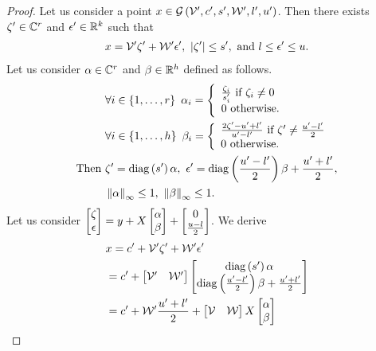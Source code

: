 \begin{proof}
Let us consider a point
$x\in\mathcal{G}\left(\mathcal{V}^\prime,c^\prime,s^\prime,\mathcal{W}^\prime,l^\prime,u^\prime\right)$.
Then there exists $\zeta^\prime\in\mathbb{C}^r$ and
$\epsilon^\prime\in\mathbb{R}^k$ such that
%
\begin{align*}
x=\ptemp^\pr\zeta^\pr+\stemp^\pr\epsilon^\pr,~\absolute{\zeta^\pr}\leq\sfact^\pr,~\text{and}~\lb\leq\epsilon^\pr\leq\ub.%
\end{align*}
%
Let us consider $\alpha\in\mathbb{C}^r$ and $\beta\in\mathbb{R}^h$ defined as follows.
%
\begin{align*}
&  \forall i\in\set{1,\ldots,r}~\alpha_i=\lt\{\begin{array}{l}
  \frac{\zeta_i}{\sfact^\pr_i}~\text{if}~\zeta_i\neq 0\\
  0~\text{otherwise}.
  \end{array}
  \rt.\\
  & \forall i\in\set{1,\ldots,h}~\beta_i=\lt\{
  \begin{array}{l}
  \frac{2\zeta^\pr-\ub^\pr+\lb^\pr}{\ub^\pr-\lb^\pr}~\text{if}~\zeta^\pr\neq\frac{\ub^\pr-\lb^\pr}{2}\\
  0~\text{otherwise}.
    \end{array}
    \rt.\\ \text{Then}~
&  \zeta^\pr=\diagonal{\sfact^\pr}\alpha,~\epsilon^\pr=\diagonal{\frac{\ub^\pr-\lb^\pr}{2}}\beta+\frac{\ub^\pr+\lb^\pr}{2},\\
&  \infnorm{\alpha}\leq 1,~\infnorm{\beta}\leq 1.%
\end{align*}
%
Let us consider $\left[\begin{matrix}\zeta\\\epsilon\end{matrix}\right]=y+X\left[\begin{matrix}\alpha\\\beta\end{matrix}\right]+\left[\begin{matrix}0\\\frac{u-l}{2}\end{matrix}\right]$.
We derive
%
\begin{align*}
  &  x=\cen^\pr+\ptemp^\pr\zeta^\pr+\stemp^\pr\epsilon^\pr\\
&   = \cen^\pr + \mymatrix{\ptemp^\pr & \stemp^\pr}\mymatrix{\diagonal{\sfact^\pr}\alpha\\
  \diagonal{\frac{\ub^\pr-\lb^\pr}{2}}\beta +
  \frac{\ub^\pr+\lb^\pr}{2}}\\
  & = \cen^\pr+\stemp^\pr\frac{\ub^\pr+\lb^\pr}{2}+\mymatrix{\ptemp &
    \stemp}X\mymatrix{\alpha\\\beta}\\

\end{align*}
\end{proof}
